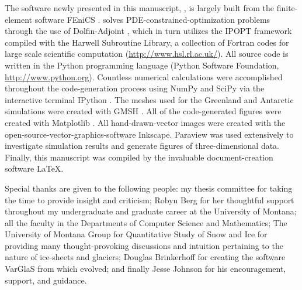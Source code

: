 The software newly presented in this manuscript, \CSLVR, is largely built from the finite-element software FEniCS \citep{logg_2012}.  \CSLVR solves PDE-constrained-optimization problems through the use of Dolfin-Adjoint \citep{farrell_2013}, which in turn utilizes the IPOPT framework \citep{waechter_2006} compiled with the Harwell Subroutine Library, a collection of Fortran codes for large scale scientific computation (\url{http://www.hsl.rl.ac.uk/}).  All \CSLVR source code is written in the Python programming language (Python Software Foundation, \url{http://www.python.org}).  Countless numerical calculations were accomplished throughout the code-generation process using NumPy and SciPy \citep{annoortvanvanderwalt_2011} via the interactive terminal IPython \citep{perez_2007}.  The meshes used for the Greenland and Antarctic simulations were created with GMSH \citep{geuzaine_2009}.  All of the code-generated figures were created with Matplotlib \citep{hunter_2007}.  All hand-drawn-vector images were created with the open-source-vector-graphics-software Inkscape.  Paraview \citep{ahrens_2005} was used extensively to investigate simulation results and generate figures of three-dimensional data.  Finally, this manuscript was compiled by the invaluable document-creation software \LaTeX.

Special thanks are given to the following people: my thesis committee for taking the time to provide insight and criticism; Robyn Berg for her thoughtful support throughout my undergraduate and graduate career at the University of Montana; all the faculty in the Departments of Computer Science and Mathematics; The University of Montana Group for Quantitative Study of Snow and Ice for providing many thought-provoking discussions and intuition pertaining to the nature of ice-sheets and glaciers; Douglas Brinkerhoff for creating the software VarGlaS \citep{brinkerhoff_2013} from which \CSLVR evolved; and finally Jesse Johnson for his encouragement, support, and guidance.
